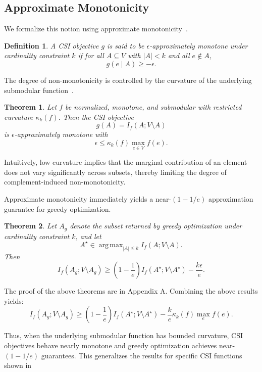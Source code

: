 \documentclass[11pt]{article}
\DeclareMathOperator*{\argmax}{arg\,max}
\newtheorem{theorem}{Theorem}
\newtheorem{definition}{Definition}
\begin{document}
\subsection{Approximate Monotonicity}

We formalize this notion using approximate monotonicity~\cite{iyer2015submodular}.

\begin{definition}
A CSI objective $g$ is said to be $\epsilon$-approximately monotone under cardinality constraint $k$ if for all $A\subseteq V$ with $|A|<k$ and all $e\notin A$,
\[
g(e\mid A)\ge -\epsilon.
\]
\end{definition}

The degree of non-monotonicity is controlled by the curvature of the underlying submodular function~\cite{conforti1984submodular,iyer2013curvature}.

\begin{theorem}
Let $f$ be normalized, monotone, and submodular with restricted curvature $\kappa_k(f)$. Then the CSI objective
\[
g(A)=I_f(A;V\setminus A)
\]
is $\epsilon$-approximately monotone with
\[
\epsilon
\le
\kappa_k(f)\max_{e\in V} f(e).
\]
\end{theorem}

Intuitively, low curvature implies that the marginal contribution of an element does not vary significantly across subsets, thereby limiting the degree of complement-induced non-monotonicity.

Approximate monotonicity immediately yields a near-$(1-1/e)$ approximation guarantee for greedy optimization.

\begin{theorem}
Let $A_g$ denote the subset returned by greedy optimization under cardinality constraint $k$, and let
\[
A^\star \in \argmax_{|A|\le k} I_f(A;V\setminus A).
\]
Then
\[
I_f(A_g;V\setminus A_g)
\ge
\left(1-\frac{1}{e}\right)
I_f(A^\star;V\setminus A^\star)
-
\frac{k\epsilon}{e}.
\]
\end{theorem}

The proof of the above theorems are in Appendix A. Combining the above results yields:
\[
I_f(A_g;V\setminus A_g)
\ge
\left(1-\frac{1}{e}\right)
I_f(A^\star;V\setminus A^\star)
-
\frac{k}{e}\kappa_k(f)\max_e f(e).
\]

Thus, when the underlying submodular function has bounded curvature, CSI objectives behave nearly monotone and greedy optimization achieves near-$(1-1/e)$ guarantees. This generalizes the results for specific CSI functions shown in~\cite{krause2008near,lin2010multi,smola2026submodular}
\end{document}
